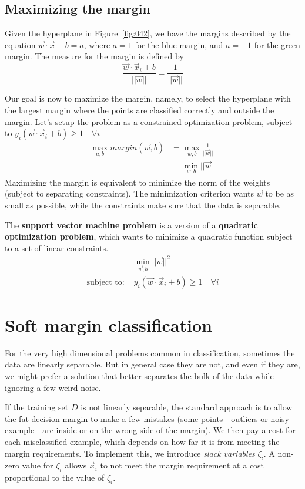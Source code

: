 \subsection{Maximizing the margin}
Given the hyperplane in Figure~\ref{fig:042}, we have the margins described by the equation \(\vec{w} \cdot \vec{x} - b = a\), where \(a=1\) for the blue margin, and \(a=-1\) for the green margin. The measure for the margin is defined by
\begin{equation}
    \frac {\vec{w} \cdot \vec{x}_i + b} {||\vec{w}||} = \frac 1 {||\vec{w}||}
\end{equation}

Our goal is now to maximize the margin, namely, to select the hyperplane with the largest margin where the points are classified correctly and outside the margin. Let's setup the problem as a constrained optimization problem, subject to \(y_i(\vec{w} \cdot \vec{x}_i + b) \geq 1 \quad \forall i\)
\begin{align}
    \max_{a,b} margin(\vec{w},b) &= \max_{w,b} \frac 1 {||\vec{w}||}\\
    &= \min_{w,b} ||\vec{w}||
\end{align}
Maximizing the margin is equivalent to minimize the norm of the weights (subject to separating constraints). The minimization criterion wants \(\vec{w}\) to be as small as possible, while the constraints make sure that the data is separable.

The \textbf{support vector machine problem} is a version of a \textbf{quadratic optimization problem}, which wants to minimize a quadratic function subject to a set of linear constraints.
\begin{align*}
    &\min_{\vec{w},b} ||\vec{w}||^2\\
    \text{subject to: } &y_i(\vec{w} \cdot \vec{x}_i + b) \geq 1 \quad \forall i
\end{align*}

\section{Soft margin classification}
For the very high dimensional problems common in classification, sometimes the data are linearly separable. But in general case they are not, and even if they are, we might prefer a solution that better separates the bulk of the data while ignoring a few weird noise. 

If the training set \(D\) is not linearly separable, the standard approach is to allow the fat decision margin to make a few mistakes (some points - outliers or noisy example - are inside or on the wrong side of the margin). We then pay a cost for each misclassified example, which depends on how far it is from meeting the margin requirements. To implement this, we introduce \emph{slack variables} \(\zeta_i\). A non-zero value for \(\zeta_i\) allows \(\vec{x}_i\) to not meet the margin requirement at a cost proportional to the value of \(\zeta_i\).

